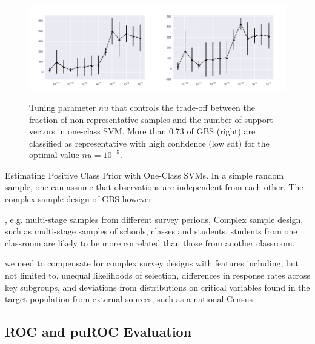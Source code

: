\begin{figure}[ht]
	\begin{center}
		\includegraphics[scale=0.55,angle=0]{fig/occfigure}
		\label{occ}
		\vspace*{-1.0cm}
		\caption{Tuning parameter \(nu\) that controls the trade-off between the fraction of non-representative samples and the number of support vectors in one-class SVM. More than 0.73 of GBS (right) are classified as representative with high confidence (low sdt) for the optimal value \(nu = 10^{-5}\).}
	\end{center}
\end{figure}

Estimating Positive Class Prior with One-Class SVMs. In a simple random sample, one can assume that observations are independent from each other. The complex sample design of GBS however

, e.g. multi-stage samples from different survey periods,
Complex sample design, such as multi-stage samples of schools, classes and students, students from one classroom are likely to be more correlated than those from another classroom. 

we need to compensate for complex survey designs with features including, but not limited to, unequal likelihoods of selection, differences in response rates across key subgroups, and deviations from distributions on critical variables found in the target population from external sources, such as a national Census

\subsection{ROC and puROC Evaluation}


